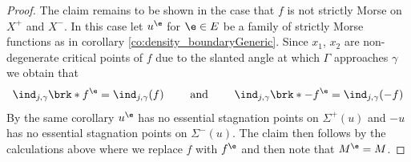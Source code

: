 \begin{proof}
  

  The claim remains to be shown in the case that $f$ is not strictly Morse on $X^+$ and $X^-$. In this case let
  $u^\e$ for $\e\in E$ be a family of strictly Morse functions as in corollary \ref{co:density_boundaryGeneric}.
  Since $x_1$, $x_2$ are non-degenerate critical points of $f$
  due to the slanted angle at which
  $\Gamma$ approaches $\gamma$
  we obtain that
  \begin{align}
    \ind_{j,\gamma}\brk*{f^\e}=\ind_{j,\gamma}(f)\qquad\text{ and }\qquad 
    \ind_{j,\gamma}\brk*{-f^\e}=\ind_{j,\gamma}(-f)
    \label{eq:n3_disproof_morse_indexApprox}
  \end{align}
  By the same corollary $u^\e$ has no essential stagnation points on $\Sigma^+(u)$
  and $-u$ has no essential stagnation points on $\Sigma^-(u)$.
  The claim then follows by the calculations above where we replace
  $f$ with $f^\e$ and then note that $M^\e=M$.
\end{proof}

